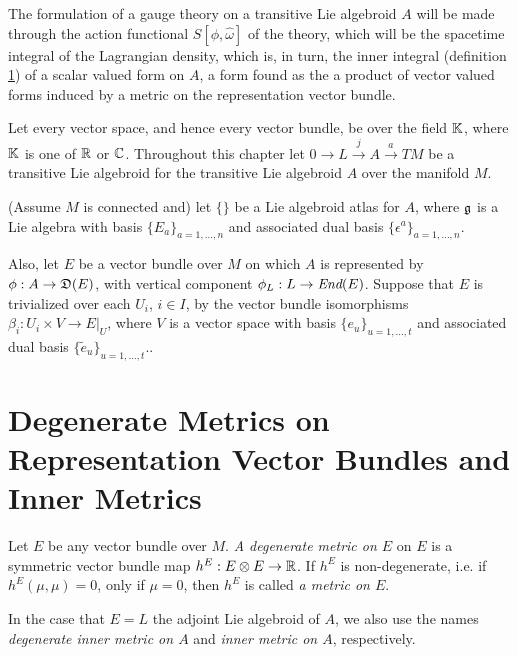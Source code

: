The formulation of a gauge theory on a transitive Lie algebroid $A$ will be made through the action functional $S[\phi, \hat \omega]$ of the theory, which will be the spacetime integral of the Lagrangian density, which is, in turn, the inner integral (definition \ref{}) of a scalar valued form on $A$, a form found as the a product of vector valued forms induced by a metric on the representation vector bundle.

Let every vector space, and hence every vector bundle, be over the field $\mathbb{K}$, where $\mathbb{K}$ is one of $\mathbb{R}$ or $\mathbb{C}$. Throughout this chapter let $0 \to L \xrightarrow{j} A \xrightarrow{a} TM$ be a transitive Lie algebroid for the transitive Lie algebroid $A$ over the manifold $M$.

(Assume $M$ is connected and) let $\{\}$ be a Lie algebroid atlas for $A$, where $\mathfrak{g}$ is a Lie algebra with basis $\{E_a\}_{a = 1, \dots, n}$ and associated dual basis $\{\epsilon^a\}_{a = 1, \dots, n}$.

Also, let $E$ be a vector bundle over $M$ on which $A$ is represented by $\phi: A \to \alg D(E)$, with vertical component $\phi_L: L \to \End(E)$. Suppose that $E$ is trivialized over each $U_i$, $i \in I$, by the vector bundle isomorphisms $\beta_i: U_i \times V \to E|_U$, where $V$ is a vector space with basis $\{e_u\}_{u = 1, \dots, t}$ and associated dual basis $\{\tilde e_u\}_{u = 1, \dots, t}$..

\section{Degenerate Metrics on Representation Vector Bundles and Inner Metrics}

\begin{definition}
    Let $E$ be any vector bundle over $M$. \emph{A degenerate metric on $E$} on $E$ is a symmetric vector bundle map $h^E: E \otimes E \to \mathbb{R}$. If $h^E$ is non-degenerate, i.e. if $h^E(\mu, \mu) = 0$, only if $\mu = 0$, then $h^E$ is called \emph{a metric on $E$}.
    
    In the case that $E = L$ the adjoint Lie algebroid of $A$, we also use the names \emph{degenerate inner metric on $A$} and \emph{inner metric on $A$}, respectively.
\end{definition}

